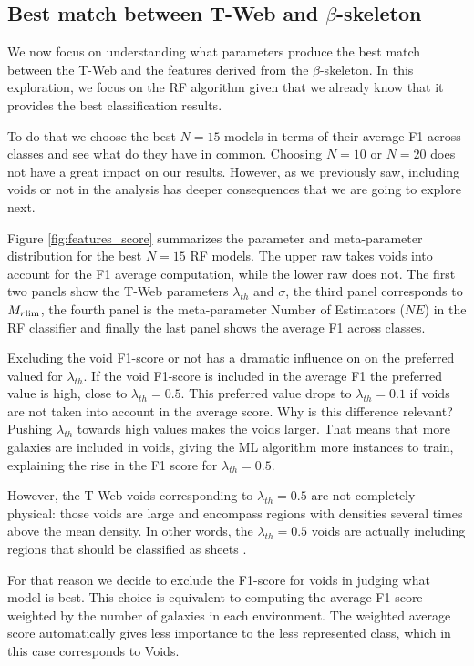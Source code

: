 \documentclass[usenatbib]{mnras}
\begin{document}
\subsection{Best match between T-Web and $\beta$-skeleton}

We now focus on understanding what parameters produce the best match between the T-Web and the features derived from the $\beta$-skeleton.
In this exploration, we focus on the RF algorithm given that we already know that it 
provides the best classification results.

To do that we choose the best $N=15$ models in terms of their average F1 across classes and see what do they have in common.
Choosing $N=10$ or $N=20$ does not have a great impact on our results. 
However, as we previously saw, including voids or not in the analysis
has deeper consequences that we are going to explore next.

Figure \ref{fig:features_score} summarizes the parameter and meta-parameter
distribution for the best $N=15$ RF models.
The upper raw takes voids into account for the F1 average computation,
while the lower raw does not.
The first two panels show the T-Web parameters
$\lambda_{th}$ and $\sigma$, the third panel corresponds to $M_{r\rm lim}$, the fourth panel is the meta-parameter Number of Estimators ($NE$) in the RF
classifier and finally the last panel shows the average F1 across classes.

Excluding the void F1-score or not has a dramatic influence on on the preferred valued for $\lambda_{th}$. 
If the void F1-score is included in the average F1 the preferred value is high, close to
$\lambda_{th}=0.5$. 
This preferred value drops to $\lambda_{th}=0.1$ if voids are not taken into account in the average score.
Why is this difference relevant?
Pushing $\lambda_{th}$ towards high values makes the voids larger.
That means that more galaxies are included in voids, giving the ML algorithm more instances to train, explaining the rise in the F1 score for $\lambda_{th}=0.5$.

However, the T-Web voids corresponding to $\lambda_{th}=0.5$ are not completely physical: those voids are large and encompass regions with densities several times above the mean density.
In other words, the $\lambda_{th}=0.5$ voids are actually including regions that should be classified as sheets \citep{Bustamante2015, Forero-Romero2009}.

For that reason we decide to exclude the F1-score for voids in judging what model is best.
This choice is equivalent to computing the average F1-score weighted by the number of galaxies in each environment. 
The weighted average score automatically gives less importance to the less represented class, which in this case corresponds to Voids.
\end{document}
